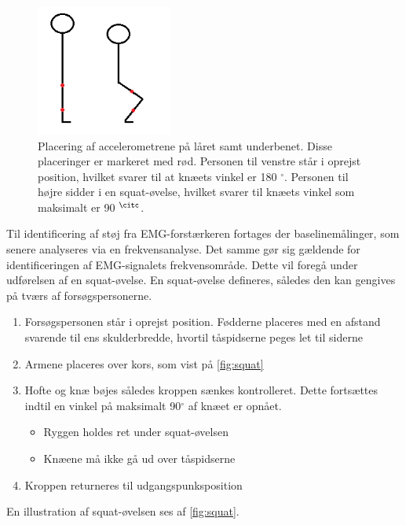 \begin{figure}[H]
\centering
\includegraphics[width=0.4\textwidth]{figures/accelerometervinkel.png}
\caption{Placering af accelerometrene på låret samt underbenet. Disse placeringer er markeret med rød. Personen til venstre står i oprejst position, hvilket svarer til at knæets vinkel er 180 $^{\circ}$. Personen til højre sidder i en squat-øvelse, hvilket svarer til knæets vinkel som maksimalt er 90 $^{\citc}$.}
\label{fig:accelerometervinkel}
\end{figure}

Til identificering af støj fra EMG-forstærkeren fortages der baselinemålinger, som senere analyseres via en frekvensanalyse. Det samme gør sig gældende for identificeringen af EMG-signalets frekvensområde. Dette vil foregå under udførelsen af en squat-øvelse.
En squat-øvelse defineres, således den kan gengives på tværs af forsøgspersonerne.\vspace{3mm}
\begin{enumerate}
\item Forsøgspersonen står i oprejst position. Fødderne placeres med en afstand svarende til ens skulderbredde, hvortil tåspidserne peges let til siderne
\item Armene placeres over kors, som vist på \autoref{fig:squat}
\item Hofte og knæ bøjes således kroppen sænkes kontrolleret. Dette fortsættes indtil en vinkel på maksimalt 90$^{\circ}$ af knæet er opnået.
	\begin{itemize}
	\item Ryggen holdes ret under squat-øvelsen 
	\item Knæene må ikke gå ud over tåspidserne 
	\end{itemize}
\item Kroppen returneres til udgangspunksposition
\end{enumerate} \vspace{3mm}
En illustration af squat-øvelsen ses af \autoref{fig:squat}.

